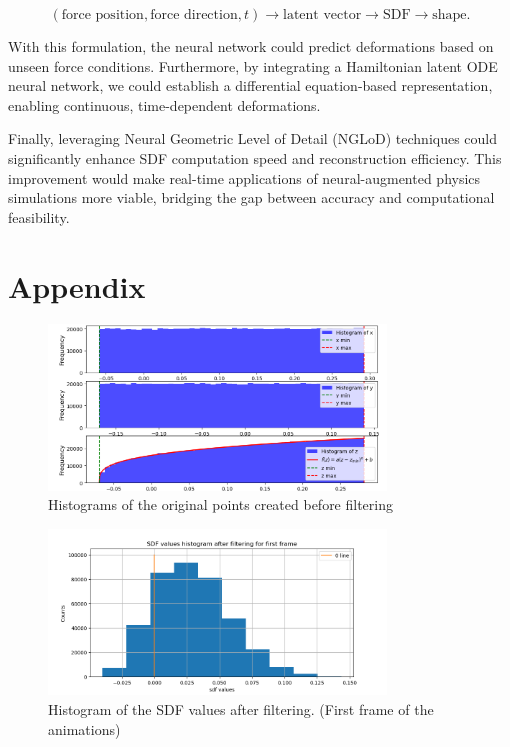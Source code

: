 \documentclass[a4paper,12pt]{article}
\begin{document}
\[
	(\text{force position}, \text{force direction}, t) \rightarrow \text{latent vector} \rightarrow \text{SDF} \rightarrow \text{shape}.
\]

With this formulation, the neural network could predict deformations based on unseen force conditions. Furthermore, by integrating a Hamiltonian latent ODE neural network, we could establish a differential equation-based representation, enabling continuous, time-dependent deformations.

Finally, leveraging Neural Geometric Level of Detail (NGLoD) techniques could significantly enhance SDF computation speed and reconstruction efficiency. This improvement would make real-time applications of neural-augmented physics simulations more viable, bridging the gap between accuracy and computational feasibility.

\newpage
\pagebreak
\section*{Appendix}

\begin{figure}[h!]
	\centering
	\includegraphics[width=0.8\textwidth]{proj/3-original-points.png}
	\caption{Histograms of the original points created before filtering}
	\label{fig:original-points-xyz}
\end{figure}

\begin{figure}[h!]
	\centering
	\includegraphics[width=0.8\textwidth]{proj/4-sdf-filtered.png}
	\caption{Histogram of the SDF values after filtering. (First frame of the animations)}
	\label{fig:sdf-hist-filtered}
\end{figure}
\end{document}
